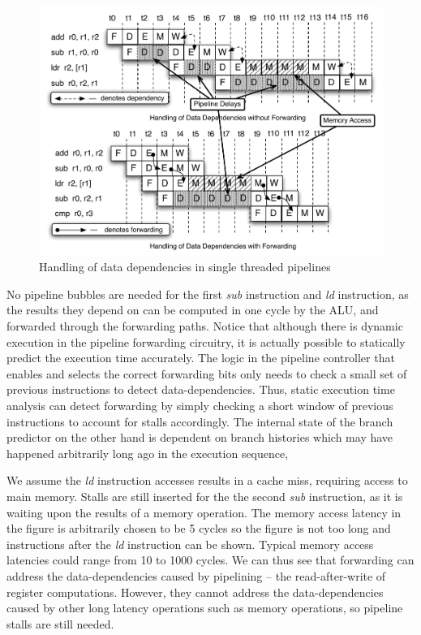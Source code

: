 \begin{figure}
\vspace{-20pt}
\begin{center}
\includegraphics[scale=.6]{figs/data_depend_execution_non_interleaved}
\end{center}
\vspace{-10pt}
\caption{Handling of data dependencies in single threaded pipelines}
\label{fig:data_depend_execution_non_interleaved}
\end{figure}
No pipeline bubbles are needed for the first \emph{sub} instruction and \emph{ld} instruction, as the results they depend on can be computed in one cycle by the ALU, and forwarded through the forwarding paths.
Notice that although there is dynamic execution in the pipeline forwarding circuitry, it is actually possible to statically predict the execution time accurately.
The logic in the pipeline controller that enables and selects the correct forwarding bits only needs to check a small set of previous instructions to detect data-dependencies. 
Thus, static execution time analysis can detect forwarding by simply checking a short window of previous instructions to account for stalls accordingly. 
The internal state of the branch predictor on the other hand is dependent on branch histories which may have happened arbitrarily long ago in the execution sequence,

We assume the \emph{ld} instruction accesses results in a cache miss, requiring access to main memory. 
Stalls are still inserted for the the second \emph{sub} instruction, as it is waiting upon the results of a memory operation. 
The memory access latency in the figure is arbitrarily chosen to be 5 cycles so the figure is not too long and instructions after the \emph{ld} instruction can be shown.  
Typical memory access latencies could range from 10 to 1000 cycles. 
We can thus see that forwarding can address the data-dependencies caused by pipelining -- the read-after-write of register computations. 
However, they cannot address the data-dependencies caused by other long latency operations such as memory operations, so pipeline stalls are still needed. 
 
